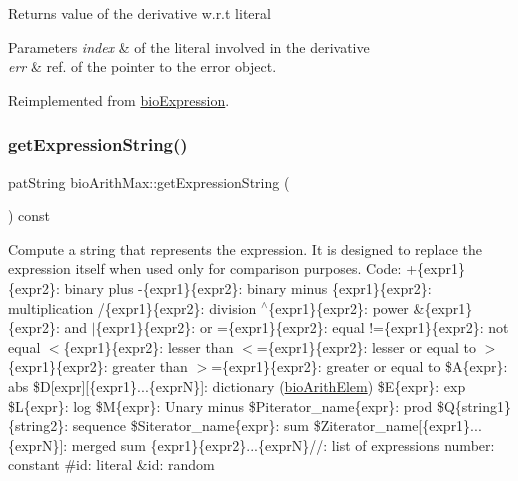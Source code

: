 \begin{DoxyReturn}{Returns}
value of the derivative w.\+r.\+t literal 
\end{DoxyReturn}

\begin{DoxyParams}{Parameters}
{\em index} & of the literal involved in the derivative \\
\hline
{\em err} & ref. of the pointer to the error object. \\
\hline
\end{DoxyParams}


Reimplemented from \hyperlink{classbio_expression_a5915579d1193f25f216c1e273c97f2ce}{bio\+Expression}.

\mbox{\label{classbio_arith_max_a600790905b0ea5f185b579c630eb25ee}} 
\subsubsection{\texorpdfstring{get\+Expression\+String()}{getExpressionString()}}
{\footnotesize\ttfamily pat\+String bio\+Arith\+Max\+::get\+Expression\+String (\begin{DoxyParamCaption}{ }\end{DoxyParamCaption}) const\hspace{0.3cm}{\ttfamily [virtual]}}

Compute a string that represents the expression. It is designed to replace the expression itself when used only for comparison purposes. Code\+: +\{expr1\}\{expr2\}\+: binary plus -\/\{expr1\}\{expr2\}\+: binary minus \{expr1\}\{expr2\}\+: multiplication /\{expr1\}\{expr2\}\+: division $^\wedge$\{expr1\}\{expr2\}\+: power \&\{expr1\}\{expr2\}\+: and $\vert$\{expr1\}\{expr2\}\+: or =\{expr1\}\{expr2\}\+: equal !=\{expr1\}\{expr2\}\+: not equal $<$\{expr1\}\{expr2\}\+: lesser than $<$=\{expr1\}\{expr2\}\+: lesser or equal to $>$\{expr1\}\{expr2\}\+: greater than $>$=\{expr1\}\{expr2\}\+: greater or equal to \$A\{expr\}\+: abs \$D\mbox{[}expr\mbox{]}\mbox{[}\{expr1\}...\{exprN\}\mbox{]}\+: dictionary (\hyperlink{classbio_arith_elem}{bio\+Arith\+Elem}) \$E\{expr\}\+: exp \$L\{expr\}\+: log \$M\{expr\}\+: Unary minus \$\+Piterator\+\_\+name\{expr\}\+: prod \$Q\{string1\}\{string2\}\+: sequence \$\+Siterator\+\_\+name\{expr\}\+: sum \$\+Ziterator\+\_\+name\mbox{[}\{expr1\}...\{exprN\}\mbox{]}\+: merged sum \{expr1\}\{expr2\}...\{exprN\}//\+: list of expressions number\+: constant \#id\+: literal \&id\+: random 

